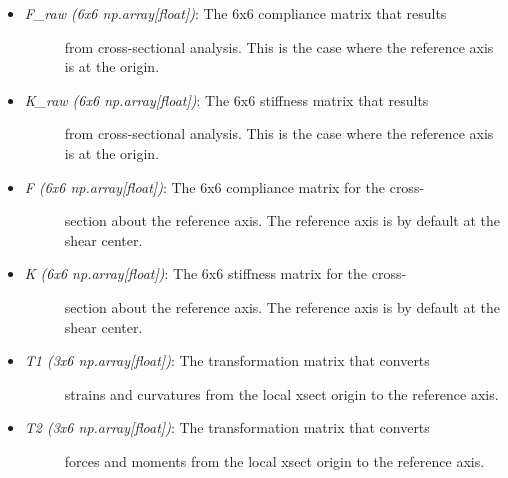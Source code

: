 \documentclass[letterpaper,10pt,english]{sphinxmanual}
\begin{document}
\begin{fulllineitems}
\begin{itemize}
\item {} \begin{description}
\item[{\emph{F\_raw (6x6 np.array{[}float{]})}: The 6x6 compliance matrix that results}] \leavevmode
from cross-sectional analysis. This is the case where the reference
axis is at the origin.

\end{description}

\item {} \begin{description}
\item[{\emph{K\_raw (6x6 np.array{[}float{]})}: The 6x6 stiffness matrix that results}] \leavevmode
from cross-sectional analysis. This is the case where the reference
axis is at the origin.

\end{description}

\item {} \begin{description}
\item[{\emph{F (6x6 np.array{[}float{]})}: The 6x6 compliance matrix for the cross-}] \leavevmode
section about the reference axis. The reference axis is by default
at the shear center.

\end{description}

\item {} \begin{description}
\item[{\emph{K (6x6 np.array{[}float{]})}: The 6x6 stiffness matrix for the cross-}] \leavevmode
section about the reference axis. The reference axis is by default
at the shear center.

\end{description}

\item {} \begin{description}
\item[{\emph{T1 (3x6 np.array{[}float{]})}: The transformation matrix that converts}] \leavevmode
strains and curvatures from the local xsect origin to the reference
axis.

\end{description}

\item {} \begin{description}
\item[{\emph{T2 (3x6 np.array{[}float{]})}: The transformation matrix that converts}] \leavevmode
forces and moments from the local xsect origin to the reference
axis.


\end{description}
\end{itemize}
\end{fulllineitems}
\end{document}

